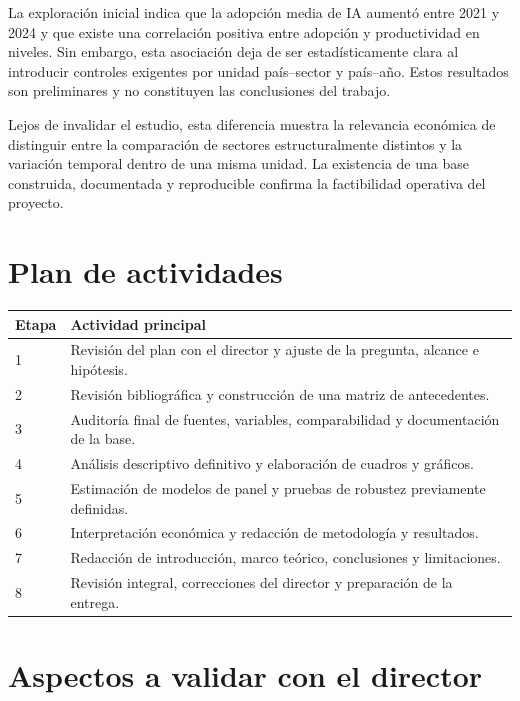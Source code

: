 \documentclass[12pt,a4paper]{article}
\begin{document}
La exploración inicial indica que la adopción media de IA aumentó entre 2021 y 2024 y que existe una correlación positiva entre adopción y productividad en niveles. Sin embargo, esta asociación deja de ser estadísticamente clara al introducir controles exigentes por unidad país--sector y país--año. Estos resultados son preliminares y no constituyen las conclusiones del trabajo.

Lejos de invalidar el estudio, esta diferencia muestra la relevancia económica de distinguir entre la comparación de sectores estructuralmente distintos y la variación temporal dentro de una misma unidad. La existencia de una base construida, documentada y reproducible confirma la factibilidad operativa del proyecto.

\section{Plan de actividades}

\begin{center}
\begin{tabular}{p{}p{}}
\toprule
\textbf{Etapa} & \textbf{Actividad principal} \\
\midrule
1 & Revisión del plan con el director y ajuste de la pregunta, alcance e hipótesis. \\
2 & Revisión bibliográfica y construcción de una matriz de antecedentes. \\
3 & Auditoría final de fuentes, variables, comparabilidad y documentación de la base. \\
4 & Análisis descriptivo definitivo y elaboración de cuadros y gráficos. \\
5 & Estimación de modelos de panel y pruebas de robustez previamente definidas. \\
6 & Interpretación económica y redacción de metodología y resultados. \\
7 & Redacción de introducción, marco teórico, conclusiones y limitaciones. \\
8 & Revisión integral, correcciones del director y preparación de la entrega. \\
\bottomrule
\end{tabular}
\end{center}

\section{Aspectos a validar con el director}
\end{document}
